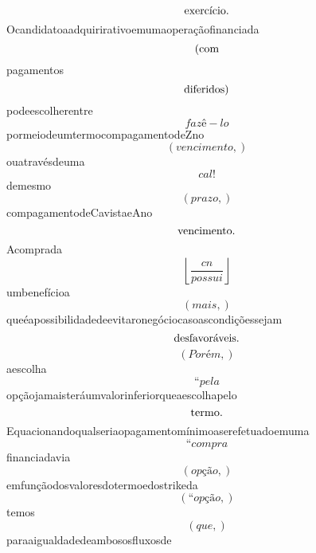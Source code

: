 \documentclass{article}
\begin{document}
\begin{equation}
$exercício.$
\end{equation}Ocandidatoaadquirirativoemumaoperaçãofinanciada\begin{equation}
$(com$
\end{equation}pagamentos\begin{equation}
$diferidos)$
\end{equation}podeescolherentre\begin{equation}
fazê - lo
\end{equation}pormeiodeumtermocompagamentodeZno\begin{equation}
\left( vencimento,\right)
\end{equation}ouatravésdeuma\begin{equation}
cal!
\end{equation}demesmo\begin{equation}
\left( prazo,\right)
\end{equation}compagamentodeCavistaeAno\begin{equation}
$vencimento.$
\end{equation}Acomprada\begin{equation}
\left\lfloor{\frac{cn}{possui}}\right\rfloor
\end{equation}umbenefícioa\begin{equation}
\left( mais,\right)
\end{equation}queéapossibilidadedeevitaronegóciocasoascondiçõessejam\begin{equation}
$desfavoráveis.$
\end{equation}\begin{equation}
\left( Porém,\right)
\end{equation}aescolha\begin{equation}
“pela
\end{equation}opçãojamaisteráumvalorinferiorqueaescolhapelo\begin{equation}
$termo.$
\end{equation}Equacionandoqualseriaopagamentomínimoaserefetuadoemuma\begin{equation}
“compra
\end{equation}financiadavia\begin{equation}
\left( opção,\right)
\end{equation}emfunçãodosvaloresdotermoedostrikeda\begin{equation}
\left( “opção,\right)
\end{equation}temos\begin{equation}
\left( que,\right)
\end{equation}paraaigualdadedeambososfluxosde\begin{equation}

\end{equation}
\end{document}
